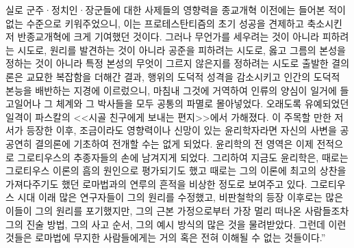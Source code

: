 실로
군주^^b7정치인^^b7장군들에 대한
사제들의
영향력을
종교개혁 이전에는 들어본 적이 없는 수준으로
키워주었으니, 이는
프로테스탄티즘의 초기 성공을 견제하고 축소시킨
저 반종교개혁에 크게 기여했던 것이다.
그러나 무언가를 세우려는 것이 아니라 피하려는 시도로,
원리를 발견하는 것이 아니라 공준을 피하려는 시도로,
옳고 그름의 본성을 정하는 것이 아니라
특정 본성의 무엇이 그르지 않은지를 정하려는 시도로
출발한 결의론은
교묘한 복잡함을 더해간 결과,
행위의 도덕적 성격을 감소시키고
인간의 도덕적 본능을 배반하는 지경에 이르렀으니,
마침내 그것에 거역하여 인류의 양심이 일거에 들고일어나
그 체계와 그 박사들을 모두 공통의 파멸로 몰아넣었다.
오래도록 유예되었던 일격이 파스칼의
<<시골 친구에게 보내는 편지>>에서
가해졌다.
이 주목할 만한 저서가 등장한 이후,
조금이라도 영향력이나 신망이 있는 윤리학자라면
자신의 사변을 공공연히 결의론에 기초하여 전개할 수는 없게 되었다.
윤리학의 전 영역은 이제 전적으로
그로티우스의 추종자들의 손에 남겨지게 되었다.
그리하여 지금도 윤리학은,
때로는 그로티우스 이론의 흠의 원인으로 평가되기도 했고
때로는 그의 이론에 최고의 상찬을 가져다주기도 했던
로마법과의 연루의 흔적을
비상한 정도로 보여주고 있다.
그로티우스 시대 이래 많은 연구자들이 그의 원리를 수정했고,
비판철학의 등장 이후로는 많은 이들이 그의 원리를 포기했지만,
그의 근본 가정으로부터 가장 멀리 떠나온 사람들조차
그의 진술 방법, 그의 사고 순서, 그의 예시 방식의 많은 것을
물려받았다.
그런데 이런 것들은 로마법에 무지한 사람들에게는 거의 혹은 전혀
이해될 수 없는 것들이다.''

